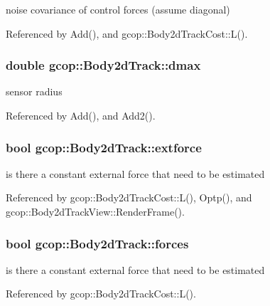 noise covariance of control forces (assume diagonal) 



\-Referenced by \-Add(), and gcop\-::\-Body2d\-Track\-Cost\-::\-L().

\subsubsection[{dmax}]{\setlength{\rightskip}{0pt plus 5cm}double {\bf gcop\-::\-Body2d\-Track\-::dmax}}\label{classgcop_1_1Body2dTrack_a467349a41cb5d3c7cc5b23031ce073b5}


sensor radius 



\-Referenced by \-Add(), and \-Add2().

\subsubsection[{extforce}]{\setlength{\rightskip}{0pt plus 5cm}bool {\bf gcop\-::\-Body2d\-Track\-::extforce}}\label{classgcop_1_1Body2dTrack_a89d77c33b2dda951af91c6e058a0bce4}


is there a constant external force that need to be estimated 



\-Referenced by gcop\-::\-Body2d\-Track\-Cost\-::\-L(), \-Optp(), and gcop\-::\-Body2d\-Track\-View\-::\-Render\-Frame().

\subsubsection[{forces}]{\setlength{\rightskip}{0pt plus 5cm}bool {\bf gcop\-::\-Body2d\-Track\-::forces}}\label{classgcop_1_1Body2dTrack_a0b1f5501e565688c314ebe3d72818263}


is there a constant external force that need to be estimated 



\-Referenced by gcop\-::\-Body2d\-Track\-Cost\-::\-L().

